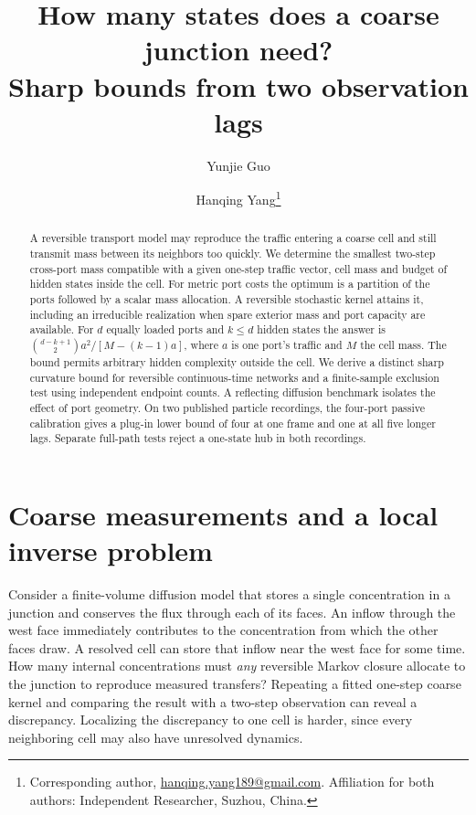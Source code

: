 \documentclass[11pt]{article}
\title{How many states does a coarse junction need?\\Sharp bounds from two observation lags}
\author{Yunjie Guo \and Hanqing Yang\thanks{Corresponding author, \href{mailto:hanqing.yang189@gmail.com}{hanqing.yang189@gmail.com}. Affiliation for both authors: Independent Researcher, Suzhou, China.}}
\date{}
\begin{document}
\maketitle
\begin{abstract}
A reversible transport model may reproduce the traffic entering a coarse cell and still transmit mass between its neighbors too quickly. We determine the smallest two-step cross-port mass compatible with a given one-step traffic vector, cell mass and budget of hidden states inside the cell. For metric port costs the optimum is a partition of the ports followed by a scalar mass allocation. A reversible stochastic kernel attains it, including an irreducible realization when spare exterior mass and port capacity are available. For \(d\) equally loaded ports and \(k\le d\) hidden states the answer is \(\binom{d-k+1}{2}a^2/[M-(k-1)a]\), where \(a\) is one port's traffic and \(M\) the cell mass. The bound permits arbitrary hidden complexity outside the cell. We derive a distinct sharp curvature bound for reversible continuous-time networks and a finite-sample exclusion test using independent endpoint counts. A reflecting diffusion benchmark isolates the effect of port geometry. On two published particle recordings, the four-port passive calibration gives a plug-in lower bound of four at one frame and one at all five longer lags. Separate full-path tests reject a one-state hub in both recordings.
\end{abstract}

\section{Coarse measurements and a local inverse problem}
Consider a finite-volume diffusion model that stores a single concentration in a junction and conserves the flux through each of its faces. An inflow through the west face immediately contributes to the concentration from which the other faces draw. A resolved cell can store that inflow near the west face for some time. How many internal concentrations must \emph{any} reversible Markov closure allocate to the junction to reproduce measured transfers? Repeating a fitted one-step coarse kernel and comparing the result with a two-step observation can reveal a discrepancy. Localizing the discrepancy to one cell is harder, since every neighboring cell may also have unresolved dynamics.
\end{document}
